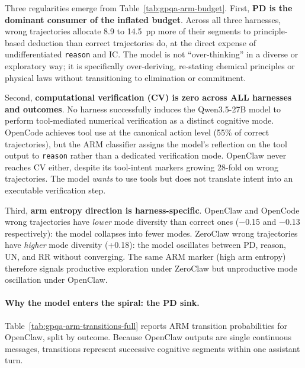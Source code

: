 Three regularities emerge from Table~\ref{tab:gpqa-arm-budget}.
First, \textbf{PD is the dominant consumer of the inflated budget}.
Across all three harnesses, wrong trajectories allocate 8.9 to 14.5~pp more of
their segments to principle-based deduction than correct trajectories do, at the
direct expense of undifferentiated \texttt{reason} and IC.
The model is not ``over-thinking'' in a diverse or exploratory way; it is
specifically over-deriving, re-stating chemical principles or physical laws
without transitioning to elimination or commitment.

Second, \textbf{computational verification (CV) is zero across ALL harnesses
and outcomes}.
No harness successfully induces the Qwen3.5-27B model to perform
tool-mediated numerical verification as a distinct cognitive mode.
OpenCode achieves tool use at the canonical action level (55\% of correct
trajectories), but the ARM classifier assigns the model's reflection on the
tool output to \texttt{reason} rather than a dedicated verification mode.
OpenClaw never reaches CV either, despite its tool-intent markers growing 28-fold
on wrong trajectories.
The model \emph{wants} to use tools but does not translate intent into an
executable verification step.

Third, \textbf{arm entropy direction is harness-specific}.
OpenClaw and OpenCode wrong trajectories have \emph{lower} mode diversity than
correct ones ($-$0.15 and $-$0.13 respectively): the model collapses into fewer
modes.
ZeroClaw wrong trajectories have \emph{higher} mode diversity (+0.18): the model
oscillates between PD, reason, UN, and RR without converging.
The same ARM marker (high arm entropy) therefore signals productive exploration
under ZeroClaw but unproductive mode oscillation under OpenClaw.

\paragraph{Why the model enters the spiral: the PD sink.}

Table~\ref{tab:gpqa-arm-transitions-full} reports ARM transition probabilities
for OpenClaw, split by outcome.
Because OpenClaw outputs are single continuous messages, transitions represent
successive cognitive segments within one assistant turn.

